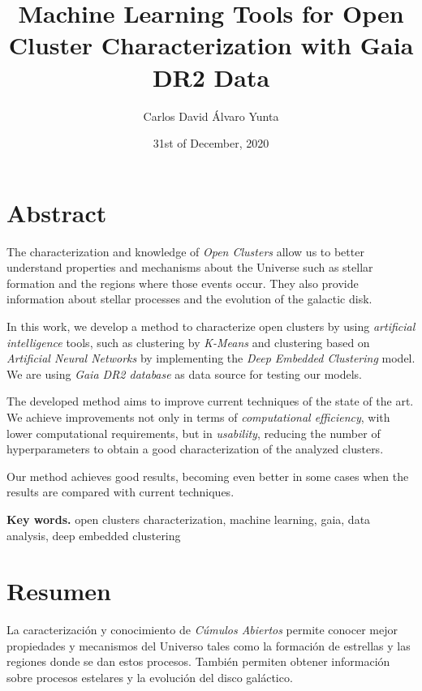 \documentclass[11pt, a4paper, english]{book}
\title{Machine Learning Tools for Open Cluster Characterization with Gaia DR2 Data}
\author{Carlos David Álvaro Yunta}
\date{31st of December, 2020}
\begin{document}

\maketitle

\frontmatter
\tableofcontents

\listoffigures
\listoftables

\chapter{Abstract}

The characterization and knowledge of \emph{Open Clusters} allow us to better understand properties and mechanisms about the Universe
such as stellar formation and the regions where those events occur.
They also provide information about stellar processes and the evolution of the galactic disk.

In this work, we develop a method to characterize open clusters by using \emph{artificial intelligence} tools,
such as clustering by \emph{K-Means} and clustering based on \emph{Artificial Neural Networks} by implementing the \emph{Deep Embedded Clustering} model.
We are using \emph{Gaia DR2 database} as data source for testing our models.

The developed method aims to improve current techniques of the state of the art.
We achieve improvements not only in terms of \emph{computational efficiency}, with lower computational requirements, but in \emph{usability},
reducing the number of hyperparameters to obtain a good characterization of the analyzed clusters.

Our method achieves good results, becoming even better in some cases when the results are compared with current techniques.

\medskip

{\bf Key words.} open clusters characterization, machine learning, gaia, data analysis, deep embedded clustering

\chapter{Resumen}

La caracterización y conocimiento de \emph{Cúmulos Abiertos} permite conocer mejor propiedades y mecanismos del Universo tales como
la formación de estrellas y las regiones donde se dan estos procesos. También permiten obtener información sobre procesos estelares
y la evolución del disco galáctico.
\end{document}
